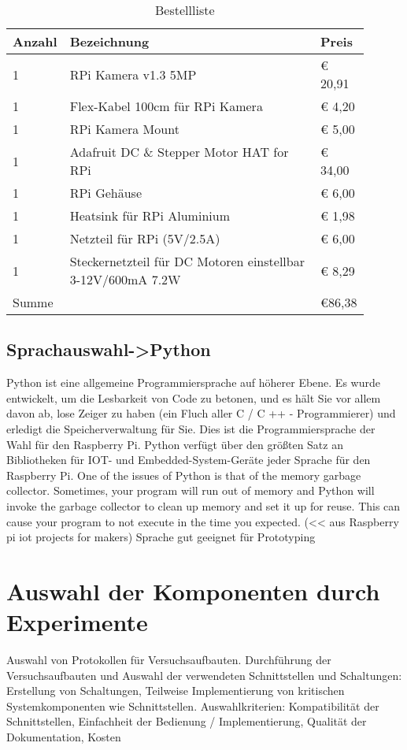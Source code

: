 \documentclass[BMR,Bachelor,ngerman]{twbook}%
\begin{document}
\begin{table}[H]
\centering
\caption{Bestellliste}
\label{tab:Order}
\begin{tabular}{| p{0.1\linewidth} | p{0.7\linewidth} | p{0.1\linewidth} |}\hline
\rowcolor[gray]{0.8} Anzahl & Bezeichnung & Preis\\\hline
	1 & RPi Kamera v1.3 5MP & \euro{ 20,91}\\\hline
	1 & Flex-Kabel 100cm für RPi Kamera & \euro{ 4,20}\\\hline
	1 & RPi Kamera Mount & \euro{ 5,00}\\\hline
	1 & Adafruit DC \& Stepper Motor HAT for RPi & \euro{ 34,00}\\\hline
	1 & RPi Gehäuse & \euro{ 6,00}\\\hline
	1 & Heatsink für RPi Aluminium & \euro{ 1,98}\\\hline
	1 & Netzteil für RPi (5V/2.5A) &\euro{ 6,00}\\\hline
	1 & Steckernetzteil für DC Motoren einstellbar 3-12V/600mA 7.2W & \euro{ 8,29}\\\hline
	Summe& & \cellcolor[gray]{0.9}\euro{86,38}\\\hline
\end{tabular}
\end{table}
%
\subsection{Sprachauswahl->Python}
{\color{blue}Python ist eine allgemeine Programmiersprache auf höherer Ebene. Es wurde entwickelt, um die Lesbarkeit von Code zu betonen, und es hält Sie vor allem davon ab, lose Zeiger zu haben
(ein Fluch aller C / C ++ - Programmierer) und erledigt die Speicherverwaltung für Sie. Dies ist die Programmiersprache der Wahl für den Raspberry Pi. Python verfügt über den größten Satz an Bibliotheken für IOT- und Embedded-System-Geräte jeder Sprache für den Raspberry Pi. One of the issues of Python is that of the memory garbage collector. Sometimes, your program will run out of memory and Python will invoke the garbage collector to clean up memory and set it up for reuse. This can cause your program to not execute in the time you expected.}
(<< aus Raspberry pi iot projects for makers)
Sprache gut geeignet für Prototyping
%
\section{Auswahl der Komponenten durch Experimente}
Auswahl von Protokollen für Versuchsaufbauten. Durchführung der Versuchsaufbauten und Auswahl der verwendeten Schnittstellen und Schaltungen: Erstellung von Schaltungen, Teilweise Implementierung von kritischen Systemkomponenten wie Schnittstellen. Auswahlkriterien: Kompatibilität der Schnittstellen, Einfachheit der Bedienung / Implementierung, Qualität der Dokumentation, Kosten
\end{document}
